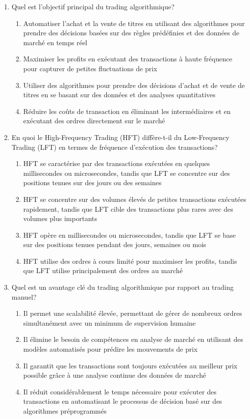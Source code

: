 \documentclass[a4paper,12pt]{article}
\begin{document}
\begin{enumerate}
    \item Quel est l'objectif principal du trading algorithmique?
    \begin{enumerate}[label=(\Alph*)]
        \item Automatiser l'achat et la vente de titres en utilisant des algorithmes pour prendre des décisions basées sur des règles prédéfinies et des données de marché en temps réel
        \item Maximiser les profits en exécutant des transactions à haute fréquence pour capturer de petites fluctuations de prix
        \item Utiliser des algorithmes pour prendre des décisions d'achat et de vente de titres en se basant sur des données et des analyses quantitatives
        \item Réduire les coûts de transaction en éliminant les intermédiaires et en exécutant des ordres directement sur le marché
    \end{enumerate}

    \item En quoi le High-Frequency Trading (HFT) diffère-t-il du Low-Frequency Trading (LFT) en termes de fréquence d'exécution des transactions?
    \begin{enumerate}[label=(\Alph*)]
        \item HFT se caractérise par des transactions exécutées en quelques millisecondes ou microsecondes, tandis que LFT se concentre sur des positions tenues sur des jours ou des semaines
        \item HFT se concentre sur des volumes élevés de petites transactions exécutées rapidement, tandis que LFT cible des transactions plus rares avec des volumes plus importants
        \item HFT opère en millisecondes ou microsecondes, tandis que LFT se base sur des positions tenues pendant des jours, semaines ou mois
        \item HFT utilise des ordres à cours limité pour maximiser les profits, tandis que LFT utilise principalement des ordres au marché
    \end{enumerate}

    \item Quel est un avantage clé du trading algorithmique par rapport au trading manuel?
    \begin{enumerate}[label=(\Alph*)]
        \item Il permet une scalabilité élevée, permettant de gérer de nombreux ordres simultanément avec un minimum de supervision humaine
        \item Il élimine le besoin de compétences en analyse de marché en utilisant des modèles automatisés pour prédire les mouvements de prix
        \item Il garantit que les transactions sont toujours exécutées au meilleur prix possible grâce à une analyse continue des données de marché
        \item Il réduit considérablement le temps nécessaire pour exécuter des transactions en automatisant le processus de décision basé sur des algorithmes préprogrammés
    \end{enumerate}


\end{enumerate}
\end{document}
